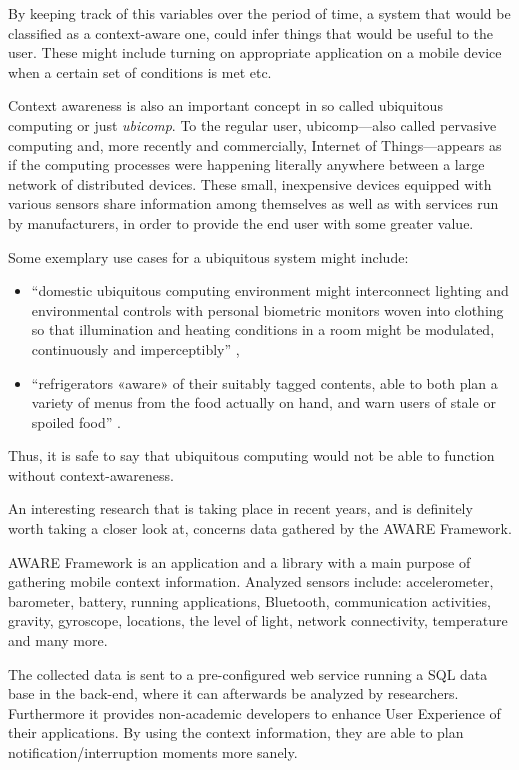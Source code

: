 By keeping track of this variables over the period of time, a system that would be classified as a context-aware one, could infer things that would be useful to the user. These might include turning on appropriate application on a mobile device when a certain set of conditions is met etc.

Context awareness is also an important concept in so called ubiquitous computing or just \emph{ubicomp}. To the regular user, ubicomp---also called pervasive computing and, more recently and commercially, Internet of Things---appears as if the computing processes were happening literally anywhere between a large network of distributed devices. These small, inexpensive devices equipped with various sensors share information among themselves as well as with services run by manufacturers, in order to provide the end user with some greater value.

Some exemplary use cases for a ubiquitous system might include:

\begin{itemize}
	\item ``domestic ubiquitous computing environment might interconnect lighting and environmental controls with personal biometric monitors woven into clothing so that illumination and heating conditions in a room might be modulated, continuously and imperceptibly'' \cite{wiki:ubiquitous},
	\item ``refrigerators «aware» of their suitably tagged contents, able to both plan a variety of menus from the food actually on hand, and warn users of stale or spoiled food'' \cite{wiki:ubiquitous}.
\end{itemize}

Thus, it is safe to say that ubiquitous computing would not be able to function without context-awareness.

An interesting research that is taking place in recent years, and is definitely worth taking a closer look at, concerns data gathered by the AWARE Framework.

AWARE Framework is an application and a library with a main purpose of gathering mobile context information. Analyzed sensors include: accelerometer, barometer, battery, running applications, Bluetooth, communication activities, gravity, gyroscope, locations, the level of light, network connectivity, temperature and many more. \cite{aware}

The collected data is sent to a pre-configured web service running a SQL data base in the back-end, where it can afterwards be analyzed by researchers. Furthermore it provides non-academic developers to enhance User Experience of their applications. By using the context information, they are able to plan notification/interruption moments more sanely. \cite{aware}

